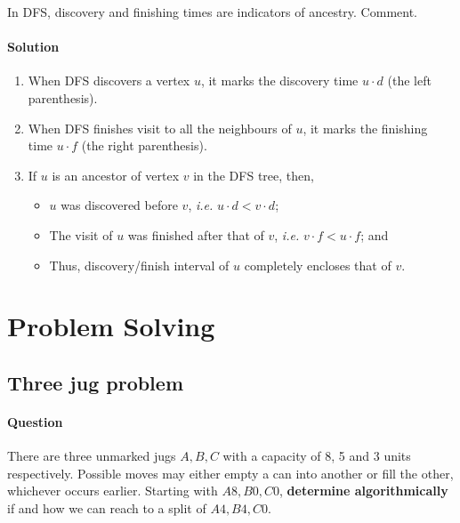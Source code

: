 \documentclass[11pt]{article}
\begin{document}
In DFS, discovery and finishing times are indicators of
ancestry.  Comment.

\paragraph*{Solution}
\label{sec:org600d85f}

\begin{enumerate}
\item When DFS discovers a vertex \(u\), it marks the
discovery time \(u\cdot d\) (the left parenthesis).
\item When DFS finishes visit to all the neighbours of
\(u\), it marks the finishing time \(u\cdot f\) (the
right parenthesis).
\item If \(u\) is an ancestor of vertex \(v\) in the DFS tree, then,
\begin{itemize}
\item \(u\) was discovered before \(v\), \emph{i.e.} \(u\cdot d <
     v\cdot d\);
\item The visit of \(u\) was finished after that of \(v\),
\emph{i.e.} \(v\cdot f < u\cdot f\); and
\item Thus, discovery/finish interval of \(u\) completely
encloses that of \(v\).
\end{itemize}
\end{enumerate}
\section{Problem Solving}
\label{sec:org07c09cd}

\subsection{Three jug problem}
\label{sec:org341c016}

\paragraph*{Question}
\label{sec:org1d3aefa}

There are three unmarked jugs \(A,B,C\) with a capacity
of 8, 5 and 3 units respectively.  Possible moves may
either empty a can into another or fill the other,
whichever occurs earlier.  Starting with \(A8,B0,C0\),
\textbf{determine algorithmically} if and how we can reach to
a split of \(A4,B4,C0\).
\end{document}
